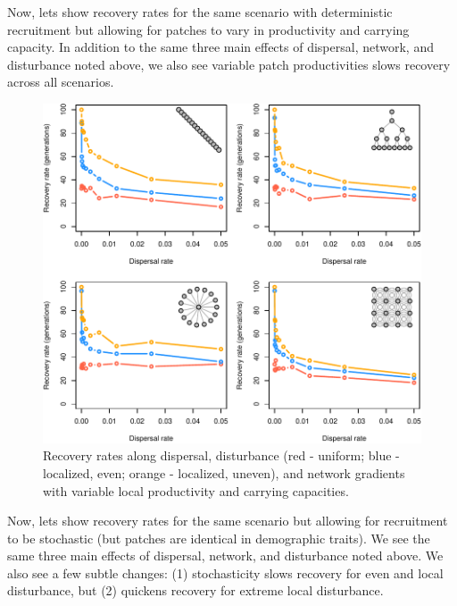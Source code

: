 \documentclass[
]{article}
\begin{document}
Now, lets show recovery rates for the same scenario with deterministic
recruitment but allowing for patches to vary in productivity and
carrying capacity. In addition to the same three main effects of
dispersal, network, and disturbance noted above, we also see variable
patch productivities slows recovery across all scenarios.

\begin{figure}[H]

{\centering \includegraphics{Managing_for_ecological_surprises_in_metapopulations_files/figure-latex/results for variables patches-1} 

}

\caption{Recovery rates along dispersal, disturbance (red - uniform; blue - localized, even; orange - localized, uneven), and network gradients with variable local productivity and carrying capacities.}\label{fig:results for variables patches}
\end{figure}
\newpage

Now, lets show recovery rates for the same scenario but allowing for
recruitment to be stochastic (but patches are identical in demographic
traits). We see the same three main effects of dispersal, network, and
disturbance noted above. We also see a few subtle changes: (1)
stochasticity slows recovery for even and local disturbance, but (2)
quickens recovery for extreme local disturbance.
\end{document}
